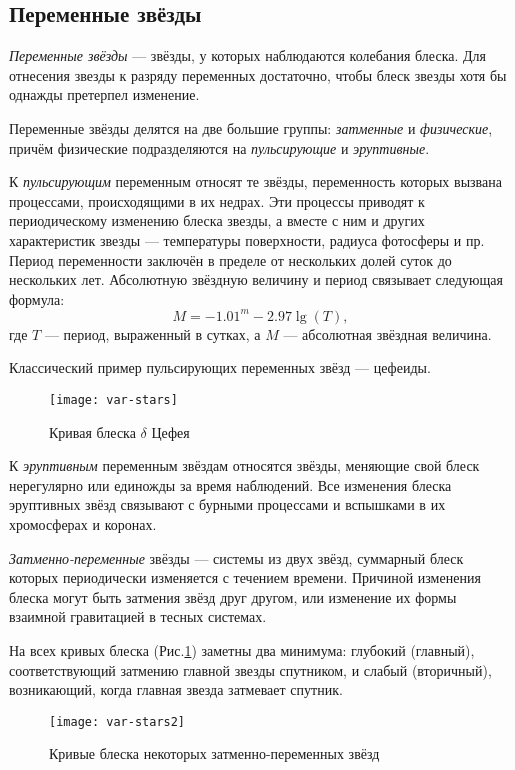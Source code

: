 \subsection{Переменные звёзды}
\textit{Переменные звёзды} --- звёзды, у которых наблюдаются колебания блеска.   Для отнесения звезды к разряду переменных достаточно, чтобы блеск звезды хотя бы однажды претерпел изменение.

Переменные звёзды делятся на две большие группы: \textit{затменные} и \textit{физические}, причём физические подразделяются на \textit{пульсирующие} и \textit{эруптивные}.

К \textit{пульсирующим} переменным  относят те звёзды, переменность которых вызвана процессами, происходящими в их недрах. Эти процессы приводят к периодическому изменению блеска звезды, а вместе с ним и других характеристик звезды --- температуры поверхности, радиуса фотосферы и пр. Период переменности заключён в пределе от нескольких долей суток до нескольких лет. Абсолютную звёздную величину  и период связывает следующая формула:
\begin{equation}
M=-1.01^m-2.97\lg(T),
\end{equation}
где $T$ --- период, выраженный в сутках, а $M$  --- абсолютная звёздная величина.

Классический пример пульсирующих переменных звёзд --- цефеиды.

\begin{figure}[h!]
\begin{center}
\texttt{[image: var-stars]}
\caption{Кривая блеска $\delta$ Цефея}
\end{center}
\end{figure}

К \textit{эруптивным} переменным звёздам относятся звёзды, меняющие свой блеск нерегулярно или единожды за время наблюдений. Все изменения блеска эруптивных звёзд связывают с бурными процессами и вспышками в их хромосферах и коронах.

\textit{Затменно-переменные} звёзды --- системы из двух звёзд, суммарный блеск которых периодически изменяется с течением времени. Причиной изменения блеска могут быть затмения звёзд друг другом, или изменение их формы взаимной гравитацией в тесных системах.

На всех кривых блеска (Рис.\ref{var-stars}) заметны два минимума: глубокий (главный), соответствующий затмению главной звезды спутником, и слабый (вторичный), возникающий, когда главная звезда затмевает спутник.

\begin{figure}[h!]
\begin{center}
\texttt{[image: var-stars2]}
\caption{Кривые блеска некоторых затменно-переменных звёзд}\label{var-stars}
\end{center}
\end{figure}



